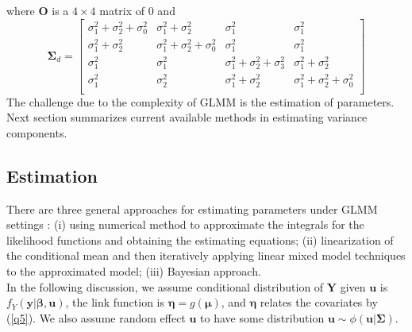 	where $\bm O$ is a $4\times 4$ matrix of 0 and 
	\[
	\bm \Sigma_d = \left[
	\begin{array}{cccc}
	\sigma^2_1+ \sigma^2_2 + \sigma^2_0  & \sigma^2_1+\sigma^2_2 & \sigma^2_1 &\sigma^2_1\\
	\sigma^2_1+\sigma^2_2 & \sigma^2_1 +\sigma^2_2 +\sigma^2_0 &\sigma^2_1 &\sigma^2_1\\
	\sigma^2_1 & \sigma^2_1& \sigma^2_1+\sigma^2_2+\sigma^2_3 & \sigma^2_1 + \sigma^2_2\\
	\sigma^2_1 &\sigma^2_2 &\sigma^2_1 +\sigma^2_2 & \sigma^2_1 +\sigma^2_2 +\sigma^2_0\\
	\end{array}
	\right]
	\]
	The challenge due to the complexity of GLMM is the estimation of parameters. Next section summarizes current available methods in estimating variance components.
	
	\subsection{Estimation}	
	There are three general approaches for estimating parameters under GLMM settings \citep[Chapter 7]{myers2012generalized}: (i) using numerical method to approximate the integrals for the likelihood functions and obtaining the estimating equations; (ii) linearization of the conditional mean and then iteratively applying linear mixed model techniques to the approximated model; (iii) Bayesian approach. \\
	
	
	
	In the following discussion, we assume conditional distribution of $\bm  Y$ given $\bm u$ is  $f_{Y}(\bm y|\bm \beta, \bm u)$,  the link function is $\bm \eta = g(\bm \mu)$, and $\bm \eta$ relates the covariates by (\ref{q5}). We also assume random effect $\bm u$ to have some distribution $\bm u \sim \phi(\bm u|\bm \Sigma)$. 
	
